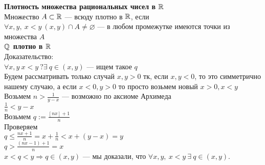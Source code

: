 \textbf{Плотность множества рациональных чисел в $\operatorname*{\mathbb{R}}$}\\
Множество $A \subset \operatorname*{\mathbb{R}}$ --- всюду плотно в $\operatorname*{\mathbb{R}}$, если\\
$\forall x,y, \ x<y \ (x,y) \cap A \neq \varnothing$ --- в любом промежутке имеются точки из множества $A$\\
\newline
\textbf{$\operatorname*{\mathbb{Q}}$ плотно в $\operatorname*{\mathbb{R}}$}\\
Доказательство:\\
$\forall x,y \ x<y \ ? \exists \ q \in (x,y)$ --- ищем такое $q$\\
Будем рассматривать только случай $x,y>0$ тк, если $x,y < 0$, то это симметрично нашему случаю, а если $x<0, y>0$ то просто возьмем новый $x > 0, x < y$\\
Возьмем $n>\frac{1}{y-x}$ --- возможно по аксиоме Архимеда\\
$\frac{1}{n}<y-x$\\
Возьмем $q := \frac{[nx]+1}{n}$\\
Проверяем\\
$q\leq \frac{nx+1}{n} = x+\frac{1}{n} < x+(y-x) = y$\\
$q > \frac{(nx-1)+1}{n} = x$\\
$x < q < y \Rightarrow q \in (x, y)$ --- мы доказали, что $\forall x,y, \ x<y \ \exists \ q \in (x,y)$.

\newpage
